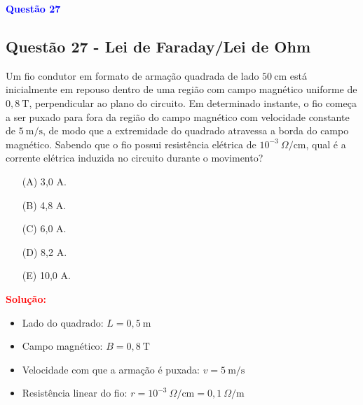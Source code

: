 \begin{flushleft}
\textbf{\textcolor{blue}{\Large Quest\~ao 27}}\\
\subsection{Quest\~ao 27 - Lei de Faraday/Lei de Ohm}
Um fio condutor em formato de armação quadrada de lado $50 \ \text{cm}$ está inicialmente em repouso dentro 
de uma região com campo magnético uniforme de $0{,}8 \ \text{T}$, perpendicular ao plano do circuito. Em determinado instante, 
o fio começa a ser puxado para fora da região do campo magnético com velocidade constante de $5 \ \text{m/s}$, de modo que a 
extremidade do quadrado atravessa a borda do campo magnético. Sabendo que o fio possui resistência elétrica de $10^{-3} \ \Omega/\text{cm}$, 
qual é a corrente elétrica induzida no circuito durante o movimento?


\begin{itemize}
\item[(A)] 3{,}0 A.
\item[(B)] 4{,}8 A.  
\item[(C)] 6{,}0 A.
\item[(D)] 8{,}2 A.
\item[(E)] 10{,}0 A.
\end{itemize}

\vspace{0.5cm}

\textcolor{red}{\textbf{Solução:}}\\

\begin{itemize}
    \item Lado do quadrado: $L = 0,5 \ \text{m}$
    \item Campo magnético: $B = 0,8 \ \text{T}$
    \item Velocidade com que a armação é puxada: $v = 5 \ \text{m/s}$
    \item Resistência linear do fio: $r = 10^{-3} \ \Omega/\text{cm} = 0,1 \ \Omega/\text{m}$
\end{itemize}

\begin{center}
\end{center}
\end{flushleft}
